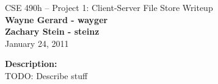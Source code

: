 \documentclass[11pt]{article}
\begin{document}
\begin{center}
{\large CSE 490h -- Project 1: Client-Server File Store Writeup} \\
\textbf{Wayne Gerard - wayger} \\
\textbf{Zachary Stein - steinz} \\
January 24, 2011
\end{center}

\textbf{Description:} \\

TODO: Describe stuff
\end{document}

